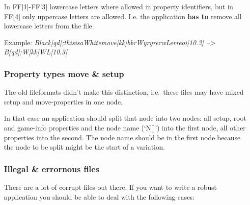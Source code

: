 In FF{[}1{]}-FF{[}3{]} lowercase letters where allowed in property
identifiers, but in FF{[}4{]} only uppercase letters are allowed. I.e.
the application \textbf{has to} remove all lowercase letters from the
file.

Example:
\emph{Black{[}qd{]};thisisaWhitemove{[}kk{]}bbrWyryrerwLerreoi{[}10.3{]}
--\textgreater{} B{[}qd{]};W{[}kk{]}WL{[}10.3{]}}

\subsubsection{Property types move \&
setup}\label{property-types-move-setup}

The old fileformats didn't make this distinction, i.e.~these files may
have mixed setup and move-properties in one node.

In that case an application should split that node into two nodes: all
setup, root and game-info properties and the node name (`N{[}{]}') into
the first node, all other properties into the second. The node name
should be in the first node because the node to be split might be the
start of a variation.

\subsubsection{Illegal \& errornous
files}\label{illegal-errornous-files}

There are a lot of corrupt files out there. If you want to write a
robust application you should be able to deal with the following cases:

